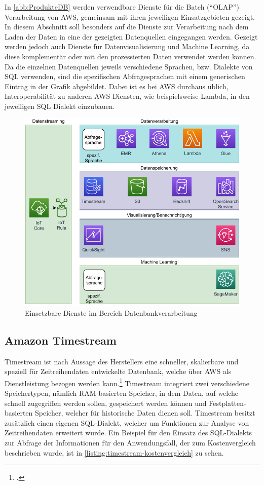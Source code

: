 In \autoref{abb:ProdukteDB} werden verwendbare Dienste für die Batch (\enquote{\ac{OLAP}}) Verarbeitung von \ac{AWS}, gemeinsam mit ihren jeweiligen Einsatzgebieten gezeigt. In diesem Abschnitt soll besonders auf die Dienste zur Verarbeitung nach dem Laden der Daten in eine der gezeigten Datenquellen eingegangen werden. Gezeigt werden jedoch auch Dienste für Datenvisualisierung und Machine Learning, da diese komplementär oder mit den prozessierten Daten verwendet werden können. Da die einzelnen Datenquellen jeweils verschiedene Sprachen, bzw. Dialekte von \ac{SQL} verwenden, sind die spezifischen Abfragesprachen mit einem generischen Eintrag in der Grafik abgebildet. Dabei ist es bei \ac{AWS} durchaus üblich, Interoperabilität zu anderen \ac{AWS} Diensten, wie beispielsweise Lambda, in den jeweiligen \ac{SQL} Dialekt einzubauen.

\begin{figure}[H]
\centering
\includegraphics[width=\textwidth]{graphics/Overview-DB.pdf}
\caption{Einsetzbare Dienste im Bereich Datenbankverarbeitung}
\label{abb:ProdukteDB}
\end{figure}


\subsection{Amazon Timestream}
Timestream ist nach Aussage des Herstellers eine schneller, skalierbare und speziell für Zeitreihendaten entwickelte Datenbank, welche über \ac{AWS} als Dienstleistung bezogen werden kann.\footcite[Vgl. auch im Folgenden][]{AmazonWebServicesInc..o.J.h} Timestream integriert zwei verschiedene Speichertypen, nämlich \ac{RAM}-basierten Speicher, in dem Daten, auf welche schnell zugegriffen werden sollen, gespeichert werden können und Festplatten-basierten Speicher, welcher für historische Daten dienen soll.
Timestream besitzt zusätzlich einen eigenen \ac{SQL}-Dialekt, welcher um Funktionen zur Analyse von Zeitreihendaten erweitert wurde. Ein Beispiel für den Einsatz des \ac{SQL}-Dialekts zur Abfrage der Informationen für den Anwendungsfall, der zum Kostenvergleich beschrieben wurde, ist in \autoref{listing:timestream-kostenvergleich} zu sehen.

